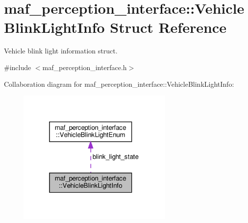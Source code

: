 \hypertarget{structmaf__perception__interface_1_1VehicleBlinkLightInfo}{}\section{maf\+\_\+perception\+\_\+interface\+:\+:Vehicle\+Blink\+Light\+Info Struct Reference}
\label{structmaf__perception__interface_1_1VehicleBlinkLightInfo}


Vehicle blink light information struct.  




{\ttfamily \#include $<$maf\+\_\+perception\+\_\+interface.\+h$>$}



Collaboration diagram for maf\+\_\+perception\+\_\+interface\+:\+:Vehicle\+Blink\+Light\+Info\+:\nopagebreak
\begin{figure}[H]
\begin{center}
\leavevmode
\includegraphics[width=217pt]{structmaf__perception__interface_1_1VehicleBlinkLightInfo__coll__graph}
\end{center}
\end{figure}
